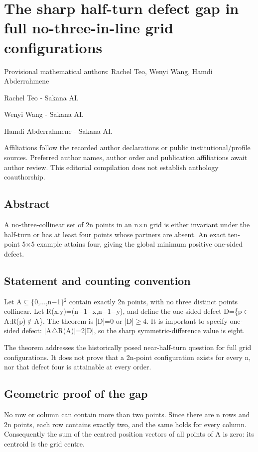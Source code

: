 \documentclass[11pt,a4paper]{article}
\begin{document}
\section{The sharp half-turn defect gap in full no-three-in-line grid configurations}
{\small Provisional mathematical authors: Rachel Teo, Wenyi Wang, Hamdi Abderrahmene\par}\medskip
{\small Rachel Teo  -  Sakana AI.\par}

{\small Wenyi Wang  -  Sakana AI.\par}

{\small Hamdi Abderrahmene  -  Sakana AI.\par}

{\small Affiliations follow the recorded author declarations or public institutional/profile sources. Preferred author names, author order and publication affiliations await author review. This editorial compilation does not establish anthology coauthorship.\par}

\subsection{Abstract}
A no-three-collinear set of 2n points in an n\ensuremath{\times}n grid is either invariant under the half-turn or has at least four points whose partners are absent. An exact ten-point 5\ensuremath{\times}5 example attains four, giving the global minimum positive one-sided defect.

\subsection{Statement and counting convention}
Let A\ensuremath{\subseteq}\{0,...,n\ensuremath{-}1\}\ensuremath{^2} contain exactly 2n points, with no three distinct points collinear. Let R(x,y)=(n\ensuremath{-}1\ensuremath{-}x,n\ensuremath{-}1\ensuremath{-}y), and define the one-sided defect D=\{p\ensuremath{\in}A:R(p)\ensuremath{\notin}A\}. The theorem is |D|=0 or |D|\ensuremath{\geq}4. It is important to specify one-sided defect: |A\ensuremath{\triangle}R(A)|=2|D|, so the sharp symmetric-difference value is eight.

The theorem addresses the historically posed near-half-turn question for full grid configurations. It does not prove that a 2n-point configuration exists for every n, nor that defect four is attainable at every order.

\subsection{Geometric proof of the gap}
No row or column can contain more than two points. Since there are n rows and 2n points, each row contains exactly two, and the same holds for every column. Consequently the sum of the centred position vectors of all points of A is zero: its centroid is the grid centre.
\end{document}
